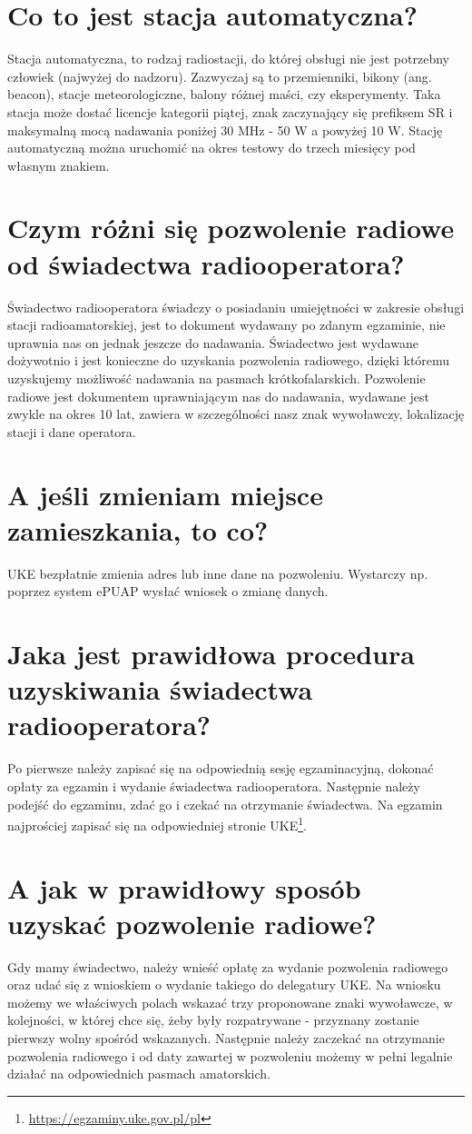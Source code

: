 \documentclass[a4paper,12pt]{article}
\begin{document}
\section{Co to jest stacja automatyczna?}
Stacja automatyczna, to rodzaj radiostacji, do której obsługi nie jest potrzebny człowiek (najwyżej do nadzoru). Zazwyczaj są to przemienniki, bikony (ang. beacon), stacje meteorologiczne, balony różnej maści, czy eksperymenty. Taka stacja może dostać licencje kategorii piątej, znak zaczynający się prefiksem SR i maksymalną mocą nadawania poniżej 30 MHz - 50 W a powyżej 10 W.
Stację automatyczną można uruchomić na okres testowy do trzech miesięcy pod własnym znakiem.

\section{Czym różni się pozwolenie radiowe od świadectwa radiooperatora?}
Świadectwo radiooperatora świadczy o posiadaniu umiejętności w zakresie obsługi stacji radioamatorskiej, jest to dokument wydawany po zdanym egzaminie, nie uprawnia nas on jednak jeszcze do nadawania. Świadectwo jest wydawane dożywotnio i jest konieczne do uzyskania pozwolenia radiowego, dzięki któremu uzyskujemy możliwość nadawania na pasmach krótkofalarskich. Pozwolenie radiowe jest dokumentem uprawniającym nas do nadawania, wydawane jest zwykle na okres 10 lat, zawiera w szczególności nasz znak wywoławczy, lokalizację stacji i dane operatora.

\section{A jeśli zmieniam miejsce zamieszkania, to co?}
UKE bezpłatnie zmienia adres lub inne dane na pozwoleniu. Wystarczy np. poprzez system ePUAP wysłać wniosek o zmianę danych. 

\section{Jaka jest prawidłowa procedura uzyskiwania świadectwa radiooperatora?}
Po pierwsze należy zapisać się na odpowiednią sesję egzaminacyjną, dokonać opłaty za egzamin i wydanie świadectwa radiooperatora. Następnie należy podejść do egzaminu, zdać go i czekać na otrzymanie świadectwa. Na egzamin najprościej zapisać się na odpowiedniej stronie UKE\footnote{\url{https://egzaminy.uke.gov.pl/pl}}. 

\section{A jak w prawidłowy sposób uzyskać pozwolenie radiowe?}
Gdy mamy świadectwo, należy wnieść opłatę za wydanie pozwolenia radiowego oraz udać się z wnioskiem o wydanie takiego do delegatury UKE. Na wniosku możemy we właściwych polach wskazać trzy proponowane znaki wywoławcze, w kolejności, w której chce się, żeby były rozpatrywane - przyznany zostanie pierwszy wolny spośród wskazanych. Następnie należy zaczekać na otrzymanie pozwolenia radiowego i od daty zawartej w pozwoleniu możemy w pełni legalnie działać na odpowiednich pasmach amatorskich.
\end{document}

